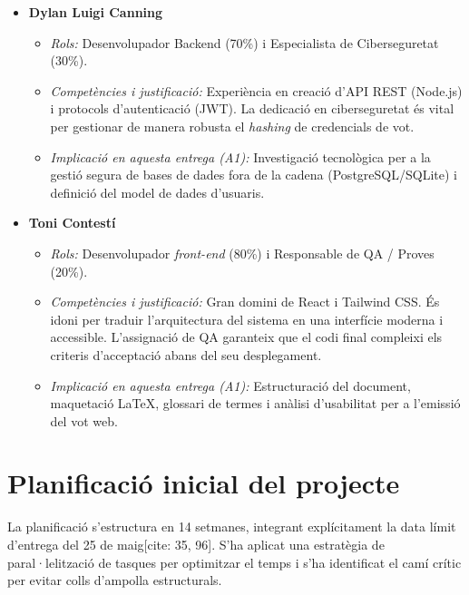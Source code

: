 \documentclass[12pt,a4paper]{article}
\begin{document}
\begin{itemize}[leftmargin=*]
    \item \textbf{Dylan Luigi Canning} 
    \begin{itemize}
        \item \textit{Rols:} Desenvolupador Backend (70\%) i Especialista de Ciberseguretat (30\%).
        \item \textit{Competències i justificació:} Experiència en creació d'API REST (Node.js)  i protocols d'autenticació (JWT). La dedicació en ciberseguretat és vital per gestionar de manera robusta el \textit{\textit{hash}ing} de credencials de vot.
        \item \textit{Implicació en aquesta entrega (A1):} Investigació tecnològica per a la gestió segura de bases de dades fora de la cadena (PostgreSQL/SQLite)  i definició del model de dades d'usuaris.
    \end{itemize}

    \item \textbf{Toni Contestí} 
    \begin{itemize}
        \item \textit{Rols:} Desenvolupador \textit{front-end} (80\%) i Responsable de QA / Proves (20\%).
        \item \textit{Competències i justificació:} Gran domini de React i Tailwind CSS. És idoni per traduir l'arquitectura del sistema en una interfície moderna i accessible. L'assignació de QA garanteix que el codi final compleixi els criteris d'acceptació abans del seu desplegament.
        \item \textit{Implicació en aquesta entrega (A1):} Estructuració del document, maquetació LaTeX, glossari de termes i anàlisi d'usabilitat per a l'emissió del vot web.
    \end{itemize}
\end{itemize}

\section{Planificació inicial del projecte}

La planificació s'estructura en 14 setmanes, integrant explícitament la data límit d'entrega del 25 de maig[cite: 35, 96]. S'ha aplicat una estratègia de paral·lelització de tasques per optimitzar el temps i s'ha identificat el camí crític per evitar colls d'ampolla estructurals.
\end{document}
